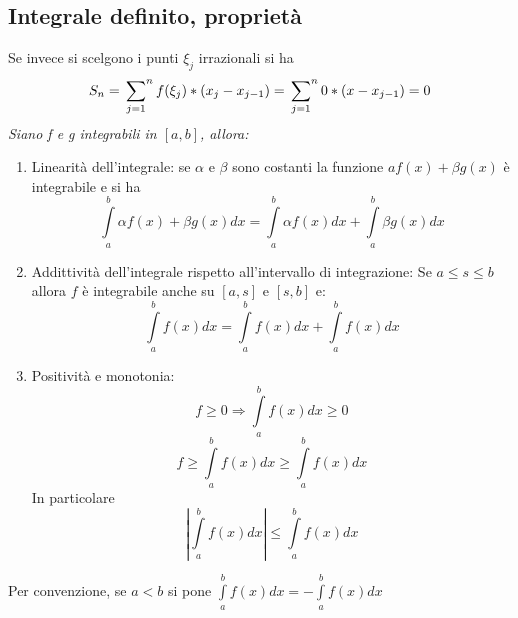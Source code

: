 \subsection{Integrale definito, proprietà}
Se invece si scelgono i punti $\xi_j$ irrazionali si ha
\begin{equation*}
	S_n=\sideset{}{^n}\sum_{j=1}f(\xi_j)*(x_j-x_{j-1})=\sideset{}{^n}\sum_{j=1}0*(x-x_{j-1})=0
\end{equation*} 
\textit{Siano f e g integrabili in $[a,b]$, allora:}
\begin{enumerate}
	\item Linearità dell'integrale: se $\alpha$ e $\beta$ sono costanti la funzione $af(x)+\beta g(x)$ è integrabile e si ha
	\begin{equation*}
		\int\limits^b_a \alpha f(x)+\beta g(x)dx=\int\limits^b_a \alpha f(x)dx+\int\limits^b_a \beta g(x)dx
	\end{equation*}
	\item Addittività dell'integrale rispetto all'intervallo di integrazione: Se $a\leq s \leq b$ allora $f$ è integrabile anche su 
	$[a,s]$ e $[s,b]$ e:
	\begin{equation*}
		\int\limits^b_a f(x)dx=\int\limits^b_a f(x)dx+\int\limits^b_af(x)dx
	\end{equation*}
	\item Positività e monotonia:
	\begin{equation*}
		f\geq 0 \Rightarrow \int\limits^b_a f(x)dx\geq 0
	\end{equation*}
	\begin{equation*}
		f\geq \int\limits^b_a f(x)dx\geq \int\limits^b_a f(x)dx
	\end{equation*}
In particolare
\begin{equation*}
	| \int\limits^b_a f(x)dx |\leq \int\limits^b_a f(x)dx
\end{equation*}
\end{enumerate}
Per convenzione, se $a<b$ si pone $\int\limits^b_a f(x)dx=-\int\limits^b_a f(x)dx$
